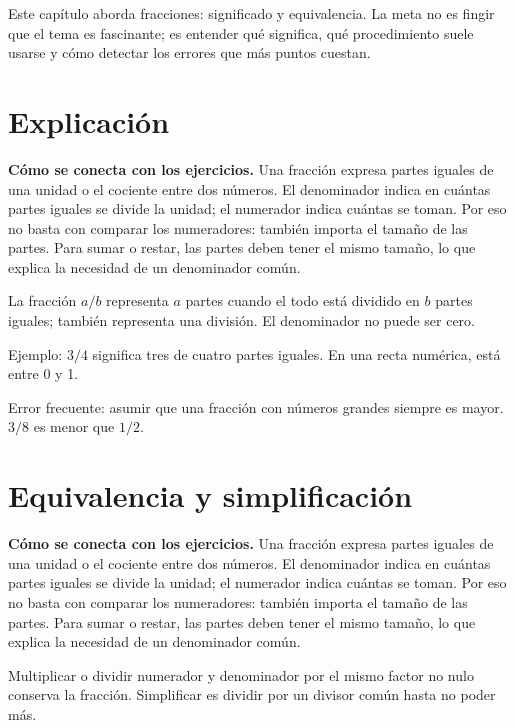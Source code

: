 \documentclass[10pt,oneside,openany]{book}
\begin{document}
\begin{idea}
Este capítulo aborda fracciones: significado y equivalencia. La meta no es fingir que el tema es fascinante; es entender qué significa, qué procedimiento suele usarse y cómo detectar los errores que más puntos cuestan.
\end{idea}

\section{Explicación}

\textbf{Cómo se conecta con los ejercicios.} Una fracción expresa partes iguales de una unidad o el cociente entre dos números. El denominador indica en cuántas partes iguales se divide la unidad; el numerador indica cuántas se toman. Por eso no basta con comparar los numeradores: también importa el tamaño de las partes. Para sumar o restar, las partes deben tener el mismo tamaño, lo que explica la necesidad de un denominador común.

La fracción $a/b$ representa $a$ partes cuando el todo está dividido en $b$ partes iguales; también representa una división. El denominador no puede ser cero.



\begin{ejemplo}
Ejemplo: $3/4$ significa tres de cuatro partes iguales. En una recta numérica, está entre 0 y 1.
\end{ejemplo}

\begin{ojo}
Error frecuente: asumir que una fracción con números grandes siempre es mayor. $3/8$ es menor que $1/2$.
\end{ojo}



\section{Equivalencia y simplificación}

\textbf{Cómo se conecta con los ejercicios.} Una fracción expresa partes iguales de una unidad o el cociente entre dos números. El denominador indica en cuántas partes iguales se divide la unidad; el numerador indica cuántas se toman. Por eso no basta con comparar los numeradores: también importa el tamaño de las partes. Para sumar o restar, las partes deben tener el mismo tamaño, lo que explica la necesidad de un denominador común.

Multiplicar o dividir numerador y denominador por el mismo factor no nulo conserva la fracción. Simplificar es dividir por un divisor común hasta no poder más.
\end{document}
